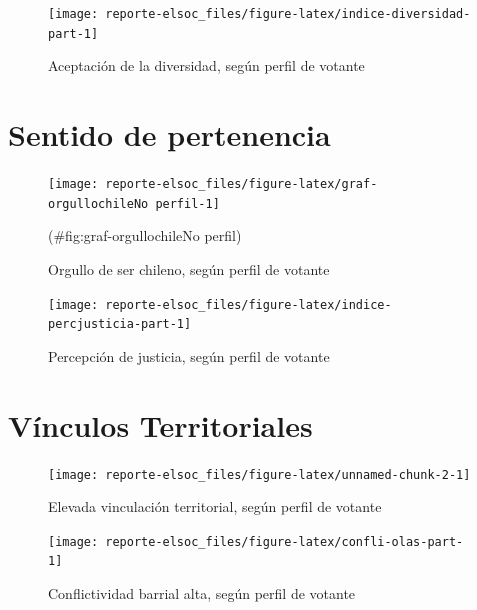 \documentclass[
  12pt,
]{book}
\begin{document}
\begin{figure}

{\centering \texttt{[image: reporte-elsoc\_files/figure-latex/indice-diversidad-part-1]} 

}

\caption{Aceptación de la diversidad, según perfil de votante}\label{fig:indice-diversidad-part}
\end{figure}

\hypertarget{sentido-de-pertenencia}{%
\section{Sentido de pertenencia}\label{sentido-de-pertenencia}}

\begin{figure}

{\centering \texttt{[image: reporte-elsoc\_files/figure-latex/graf-orgullochileNo perfil-1]} 

}

\caption{Orgullo de ser chileno, según perfil de votante}(\#fig:graf-orgullochileNo perfil)
\end{figure}

\begin{figure}

{\centering \texttt{[image: reporte-elsoc\_files/figure-latex/indice-percjusticia-part-1]} 

}

\caption{Percepción de justicia, según perfil de votante}\label{fig:indice-percjusticia-part}
\end{figure}

\hypertarget{vuxednculos-territoriales}{%
\section{Vínculos Territoriales}\label{vuxednculos-territoriales}}

\begin{figure}

{\centering \texttt{[image: reporte-elsoc\_files/figure-latex/unnamed-chunk-2-1]} 

}

\caption{Elevada vinculación territorial, según perfil de votante}\label{fig:unnamed-chunk-2}
\end{figure}

\begin{figure}

{\centering \texttt{[image: reporte-elsoc\_files/figure-latex/confli-olas-part-1]} 

}

\caption{Conflictividad barrial alta, según perfil de votante}\label{fig:confli-olas-part}
\end{figure}
\end{document}
